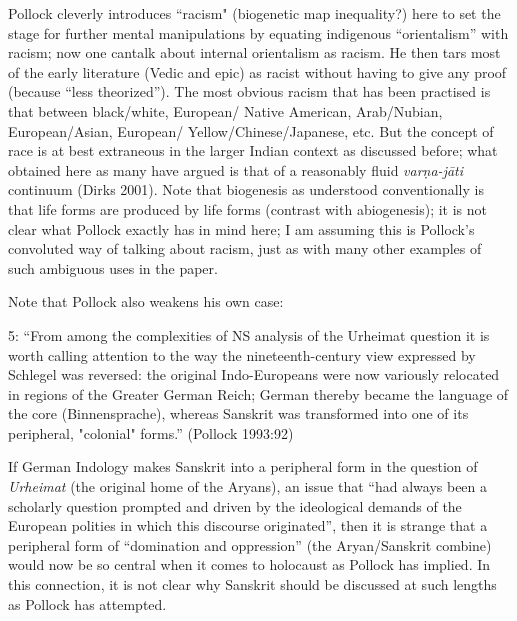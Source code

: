 {\begin{enumerate}
Pollock cleverly introduces “racism" (biogenetic map inequality?) here to set the stage for further mental manipulations by equating indigenous “orientalism” with racism; now one can\break talk about internal orientalism as racism. He then tars most of the early literature (Vedic and epic) as racist without having to give any proof (because “less theorized”). The most obvious racism that has been practised is that between black/white, European/ Native American, Arab/Nubian, European/Asian, European/ Yellow/Chinese/Japanese, etc. But the concept of race is at best extraneous in the larger Indian context as discussed before; what obtained here as many have argued is that of a reasonably fluid {\sl varṇa-jāti} continuum (Dirks 2001). Note that biogenesis as understood conventionally is that life forms are  produced by life forms (contrast with abiogenesis); it is not clear what Pollock exactly has in mind here; I am assuming this is Pollock’s convoluted way of talking about racism, just as with many other examples of such ambiguous uses in the paper.

Note that Pollock also weakens his own case:
\begin{myquote}
5: “From among the complexities of NS analysis of the Urheimat question it is worth calling attention to the way the nineteenth-century view expressed by Schlegel was reversed: the original Indo-Europeans were now variously relocated in regions of the Greater German Reich; German thereby became the language of the core (Binnensprache), whereas Sanskrit was transformed into one of its peripheral, "colonial" forms.” \hfill 	(Pollock 1993:92)
\end{myquote}
\medskip

If German Indology makes Sanskrit into a peripheral form in the question of {\sl Urheimat} (the original home of the Aryans), an issue that “had always been a scholarly question prompted and driven by the ideological demands of the European polities in which this discourse originated”, then it is strange that a peripheral form of “domination and oppression” (the Aryan/Sanskrit combine) would now be so central when it comes to holocaust as Pollock has implied. In this connection, it is not clear why Sanskrit should be discussed at such lengths as Pollock has attempted.


\end{enumerate}}

